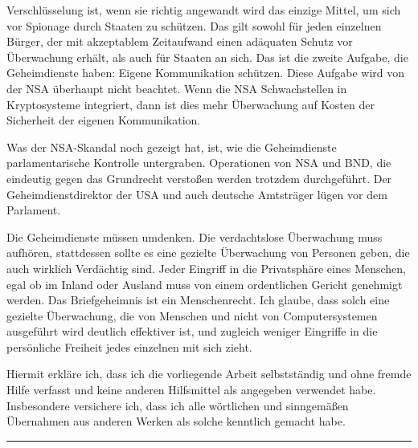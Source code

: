 \documentclass[12pt,a4paper]{scrartcl}
\begin{document}
Verschlüsselung ist, wenn sie richtig angewandt wird das einzige Mittel, um sich vor Spionage durch Staaten zu schützen. Das gilt sowohl für jeden einzelnen Bürger, der mit akzeptablem Zeitaufwand einen adäquaten Schutz vor Überwachung erhält, als auch für Staaten an sich. Das ist die zweite Aufgabe, die Geheimdienste haben: Eigene Kommunikation schützen. Diese Aufgabe wird von der NSA überhaupt nicht beachtet. Wenn die NSA Schwachstellen in Kryptosysteme integriert, dann ist dies mehr Überwachung auf Kosten der Sicherheit der eigenen Kommunikation.

Was der NSA-Skandal noch gezeigt hat, ist, wie die Geheimdienste parlamentarische Kontrolle untergraben. Operationen von NSA und BND, die eindeutig gegen das Grundrecht verstoßen werden trotzdem durchgeführt. Der Geheimdienstdirektor der USA und auch deutsche Amtsträger lügen vor dem Parlament.

Die Geheimdienste müssen umdenken. Die verdachtslose Überwachung muss aufhören, stattdessen sollte es eine gezielte Überwachung von Personen geben, die auch wirklich Verdächtig sind. Jeder Eingriff in die Privatsphäre eines Menschen, egal ob im Inland oder Ausland muss von einem ordentlichen Gericht genehmigt werden. Das Briefgeheimnis ist ein Menschenrecht. Ich glaube, dass solch eine gezielte Überwachung, die von Menschen und nicht von Computersystemen ausgeführt wird deutlich effektiver ist, und zugleich weniger Eingriffe in die persönliche Freiheit jedes einzelnen mit sich zieht.

\newpage
\printbibliography
\vspace{2cm}
Hiermit erkläre ich, dass ich die vorliegende Arbeit selbstständig und ohne fremde Hilfe verfasst und keine anderen Hilfsmittel als angegeben verwendet habe. Insbesondere versichere ich, dass ich alle wörtlichen und sinngemäßen Übernahmen aus anderen Werken als solche kenntlich gemacht habe.
\vspace{2cm}
\hrule
\end{document}

